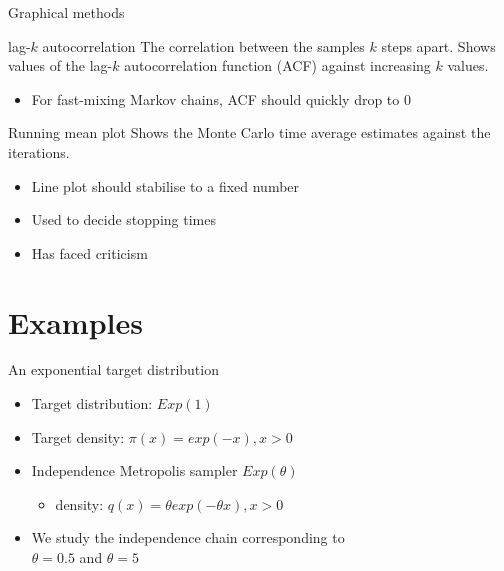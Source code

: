 \documentclass{beamer}
\begin{document}
\begin{frame}{Graphical methods}
  \begin{block}{lag-$k$ autocorrelation}
    The correlation between the samples $k$ steps apart. Shows values of the lag-$k$ autocorrelation function (ACF) against increasing $k$ values.
    \begin{itemize}
      \item For fast-mixing Markov chains, ACF should quickly drop to $0$
    \end{itemize}
  \end{block}
  \begin{block}{Running mean plot}
    Shows the Monte Carlo time average estimates against the iterations.
    \begin{itemize}
      \item Line plot should stabilise to a fixed number
      \item Used to decide stopping times
      \item Has faced criticism
    \end{itemize}
  \end{block}
\end{frame}

%
%
%

\section{Examples}

\begin{frame}{An exponential target distribution}
  \begin{block}{}
    \begin{itemize}
      \item Target distribution: $Exp(1)$
      \item Target density: $\pi(x) = exp(-x), x > 0$
      \item Independence Metropolis sampler $Exp(\theta)$
        \begin{itemize}
          \item density: $q(x) = \theta exp(-\theta x), x > 0$
        \end{itemize}
      \item We study the independence chain corresponding to\\
        $\theta = 0.5$ and $\theta = 5$
    \end{itemize}
  \end{block}
\end{frame}
\end{document}
